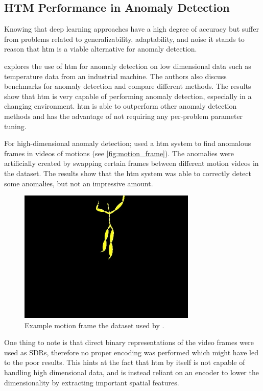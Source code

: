 \subsection{HTM Performance in Anomaly Detection}
\label{sec:htm_perf}
Knowing that deep learning approaches have a high degree of accuracy but suffer from problems related to generalizability, adaptability, and noise it stands to reason that \gls*{htm} is a viable alternative for anomaly detection.\par
\textcite{AHMAD2017134} explores the use of \gls*{htm} for anomaly detection on low dimensional data such as temperature data from an industrial machine. The authors also discuss benchmarks for anomaly detection and compare different methods. The results show that \gls*{htm} is very capable of performing anomaly detection, especially in a changing environment. \gls*{htm} is able to outperform other anomaly detection methods and has the advantage of not requiring any per-problem parameter tuning.
\par
For high-dimensional anomaly detection; \textcite{MotionAnomalyDetection} used a \gls*{htm} system to find anomalous frames in videos of motions (see \autoref{fig:motion_frame}). The anomalies were artificially created by swapping certain frames between different motion videos in the dataset. The results show that the \gls*{htm} system was able to correctly detect some anomalies, but not an impressive amount.
\begin{figure}[H]
    \centering
    \includegraphics[width=0.5\linewidth]{resources/related_works/motion_frame.png}
    \caption[Example Motion Frame]{Example motion frame the dataset used by \textcite{MotionAnomalyDetection}.}
    \label{fig:motion_frame}
\end{figure}
One thing to note is that direct binary representations of the video frames were used as SDRs, therefore no proper encoding was performed which might have led to the poor results. This hints at the fact that \gls*{htm} by itself is not capable of handling high dimensional data, and is instead reliant on an encoder to lower the dimensionality by extracting important spatial features.
